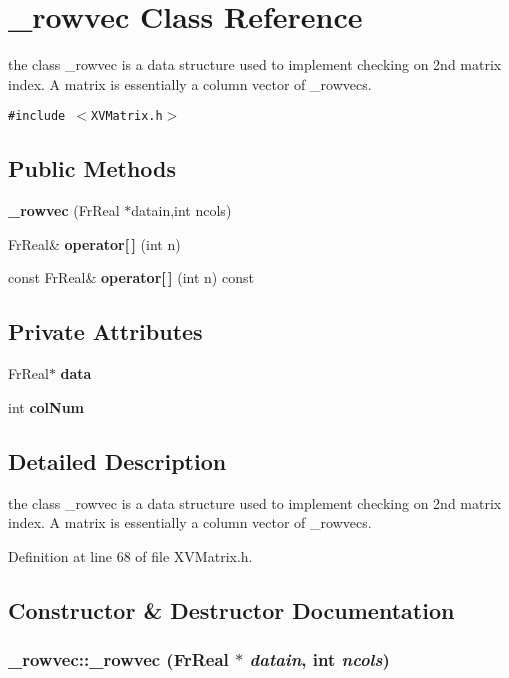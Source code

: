 \hypertarget{class__rowvec}{
\section{\_\-rowvec  Class Reference}
\label{_rowvec}
}
the class \_\-rowvec is a data structure used to implement checking on 2nd matrix index. A matrix is essentially a column vector of \_\-rowvecs. 


{\tt \#include $<$XVMatrix.h$>$}

\subsection*{Public Methods}
\begin{CompactItemize}
\item 
{\bf \_\-rowvec} (Fr\-Real $\ast$datain,int ncols)
\item 
Fr\-Real\& {\bf operator\mbox{[}$\,$\mbox{]}} (int n)
\item 
const Fr\-Real\& {\bf operator\mbox{[}$\,$\mbox{]}} (int n) const
\end{CompactItemize}
\subsection*{Private Attributes}
\begin{CompactItemize}
\item 
Fr\-Real$\ast$ {\bf data}
\item 
int {\bf col\-Num}
\end{CompactItemize}


\subsection{Detailed Description}
the class \_\-rowvec is a data structure used to implement checking on 2nd matrix index. A matrix is essentially a column vector of \_\-rowvecs.





Definition at line 68 of file XVMatrix.h.

\subsection{Constructor \& Destructor Documentation}
\label{_rowvec_a0}
\hypertarget{class__rowvec_a0}{
\subsubsection[_rowvec]{\setlength{\rightskip}{0pt plus 5cm}\_\-rowvec::\_\-rowvec (Fr\-Real $\ast$ {\em datain}, int {\em ncols})}}




